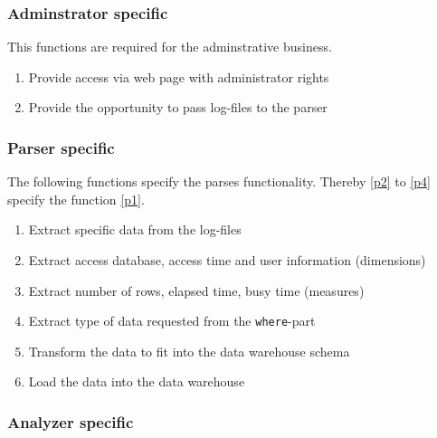 \subsubsection*{Adminstrator specific}
This functions are required for the adminstrative business.

\begin{enumerate}[resume]
  
  \item Provide access via web page with administrator rights
   
  \item Provide the opportunity to pass log-files to the parser
   
\end{enumerate}


\subsubsection*{Parser specific}
 
 The following functions specify the parses functionality.
 Thereby \ref{p2} to \ref{p4} specify the function \ref{p1}.
 
\begin{enumerate}[resume]
  
  \item Extract specific data from the log-files \label{p1}
  
  \item Extract access database, access time and user information (dimensions)\label{p2} %
  
  \item Extract number of rows, elapsed time, busy time (measures) %
  
  \item Extract type of data requested from the \texttt{where}-part\label{p4} %
  
  \item Transform the data to fit into the data warehouse schema
  
  \item Load the data into the data warehouse

\end{enumerate}

\subsubsection*{Analyzer specific}
 
